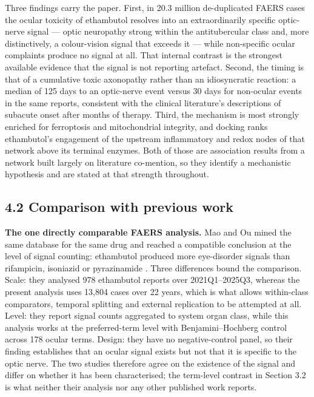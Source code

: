 \documentclass[utf8]{FrontiersinVancouver}
\begin{document}
Three findings carry the paper. First, in 20.3 million de-duplicated FAERS cases the ocular toxicity of ethambutol resolves into an extraordinarily specific optic-nerve signal --- optic neuropathy strong within the antitubercular class and, more distinctively, a colour-vision signal that exceeds it --- while non-specific ocular complaints produce no signal at all. That internal contrast is the strongest available evidence that the signal is not reporting artefact. Second, the timing is that of a cumulative toxic axonopathy rather than an idiosyncratic reaction: a median of 125 days to an optic-nerve event versus 30 days for non-ocular events in the same reports, consistent with the clinical literature's descriptions of subacute onset after months of therapy. Third, the mechanism is most strongly enriched for ferroptosis and mitochondrial integrity, and docking ranks ethambutol's engagement of the upstream inflammatory and redox nodes of that network above its terminal enzymes. Both of those are association results from a network built largely on literature co-mention, so they identify a mechanistic hypothesis and are stated at that strength throughout.

\subsection{4.2 Comparison with previous work}

\textbf{The one directly comparable FAERS analysis.} Mao and Ou mined the same database for the same drug and reached a compatible conclusion at the level of signal counting: ethambutol produced more eye-disorder signals than rifampicin, isoniazid or pyrazinamide \citep{q2026b}. Three differences bound the comparison. Scale: they analysed 978 ethambutol reports over 2021Q1--2025Q3, whereas the present analysis uses 13,804 cases over 22 years, which is what allows within-class comparators, temporal splitting and external replication to be attempted at all. Level: they report signal counts aggregated to system organ class, while this analysis works at the preferred-term level with Benjamini--Hochberg control across 178 ocular terms. Design: they have no negative-control panel, so their finding establishes that an ocular signal exists but not that it is specific to the optic nerve. The two studies therefore agree on the existence of the signal and differ on whether it has been characterised; the term-level contrast in Section 3.2 is what neither their analysis nor any other published work reports.
\end{document}

